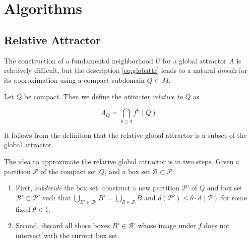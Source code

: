 \section{Algorithms}


\subsection{Relative Attractor}

The construction of a fundamental neighborhood $U$ for a global attractor $A$ is
relatively difficult, but the description \autoref{eq:globattr} lends to 
a natural \emph{ansatz} for its approximation using a compact subdomain $Q \subset M$. \\

\begin{definition}
    Let $Q$ be compact. Then we define the \emph{attractor relative to $Q$} as

    \begin{equation}
        A_Q = \bigcap\limits_{k \geq 0} f^k (Q)
    \end{equation}

\end{definition}

\begin{remark}
    It follows from the definition that the relative global attractor is a subset of the 
    global attractor.\\
\end{remark}

The idea to approximate the relative global attractor is in two steps. Given a partition 
$\mathcal{P}$ of the compact set $Q$, and a box set $\mathcal{B} \subset \mathcal{P}$: 

\begin{enumerate}
    \item First, \emph{subdivide} the box set: construct a new partition 
    $\mathcal{P}'$ of $Q$ and box set $\mathcal{B}' \subset \mathcal{P}'$ 
    such that $\bigcup_{B' \in \mathcal{B}'} B' = \bigcup_{B \in \mathcal{B}} B$ 
    and $d(\mathcal{P}') \leq \theta \cdot d(\mathcal{P})$ for some fixed $\theta < 1$. 
    \item Second, discard all those boxes $B' \in \mathcal{B}'$ whose image under $f$ does 
    not intersect with the current box set. 
\end{enumerate}

